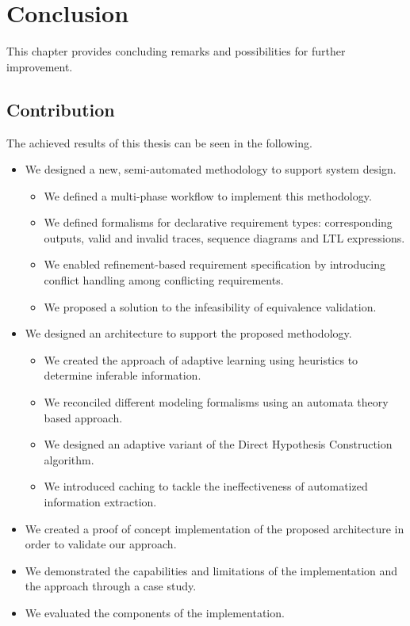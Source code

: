 \chapter{Conclusion} \label{conclusion}
This chapter provides concluding remarks and possibilities for further improvement.

\section{Contribution}

The achieved results of this thesis can be seen in the following.

\begin{itemize}
	\item We designed a new, semi-automated methodology to support system design.
	\begin{itemize}
		\item We defined a multi-phase workflow to implement this methodology.
		\item We defined formalisms for declarative requirement types: corresponding outputs, valid and invalid traces, sequence diagrams and LTL expressions.
		\item We enabled refinement-based requirement specification by introducing conflict handling among conflicting requirements.
		\item We proposed a solution to the infeasibility of equivalence validation.
	\end{itemize}
	\item We designed an architecture to support the proposed methodology.
	\begin{itemize}
		\item We created the approach of adaptive learning using heuristics to determine inferable information.
		\item We reconciled different modeling formalisms using an automata theory based approach.
		\item We designed an adaptive variant of the Direct Hypothesis Construction algorithm.
		\item We introduced caching to tackle the ineffectiveness of automatized information extraction.
	\end{itemize}
	\item We created a proof of concept implementation of the proposed architecture in order to validate our approach.
	\item We demonstrated the capabilities and limitations of the implementation and the approach through a case study.
	\item We evaluated the components of the implementation.
\end{itemize}
\clearpage
